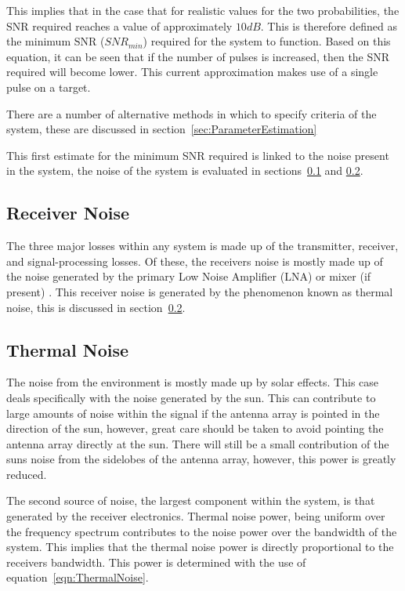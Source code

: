 \documentclass[11pt]{witseiepaper}
\begin{document}
This implies that in the case that for realistic values for the two probabilities, the SNR required reaches a value of approximately $10 dB$.
This is therefore defined as the minimum SNR ($SNR_{min}$) required for the system to function.
Based on this equation, it can be seen that if the number of pulses is increased, then the SNR required will become lower. This current approximation makes use of a single pulse on a target.

There are a number of alternative methods in which to specify criteria of the system, these are discussed in section~\ref{sec:ParameterEstimation} \cite[p.~72]{radarHandbook}

This first estimate for the minimum SNR required is linked to the noise present in the system, the noise of the system is evaluated in sections~\ref{sec:ReceiverNoise} and \ref{sec:ThermalNoise}.


\subsection{Receiver Noise} \label{sec:ReceiverNoise}
The three major losses within any system is made up of the transmitter, receiver, and signal-processing losses.
Of these, the receivers noise is mostly made up of the noise generated by the primary Low Noise Amplifier (LNA) or mixer (if present) \cite[p.~405]{radarHandbook}.
This receiver noise is generated by the phenomenon known as thermal noise, this is discussed in section~\ref{sec:ThermalNoise}.

\subsection{Thermal Noise} \label{sec:ThermalNoise}
The noise from the environment is mostly made up by solar effects. This case deals specifically with the noise generated by the sun. This can contribute to large amounts of noise within the signal if the antenna array is pointed in the direction of the sun, however, great care should be taken to avoid pointing the antenna array directly at the sun. There will still be a small contribution of the suns noise from the sidelobes of the antenna array, however, this power is greatly reduced.

The second source of noise, the largest component within the system, is that generated by the receiver electronics.
Thermal noise power, being uniform over the frequency spectrum contributes to the noise power over the bandwidth of the system. This implies that the thermal noise power is directly proportional to the receivers bandwidth. This power is determined with the use of equation~\ref{eqn:ThermalNoise}.
\end{document}
